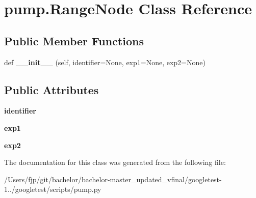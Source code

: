 \hypertarget{classpump_1_1_range_node}{}\section{pump.\+Range\+Node Class Reference}
\label{classpump_1_1_range_node}
\subsection*{Public Member Functions}
\begin{DoxyCompactItemize}
\item 
\mbox{\label{classpump_1_1_range_node_a58e85945a5a6e2f899e8243422c871e3}} 
def {\bfseries \+\_\+\+\_\+init\+\_\+\+\_\+} (self, identifier=None, exp1=None, exp2=None)
\end{DoxyCompactItemize}
\subsection*{Public Attributes}
\begin{DoxyCompactItemize}
\item 
\mbox{\label{classpump_1_1_range_node_ae75b9f31ba8c3bd048cf09b22035efa0}} 
{\bfseries identifier}
\item 
\mbox{\label{classpump_1_1_range_node_acbb59f8c5e23d23563ca03f21574ce63}} 
{\bfseries exp1}
\item 
\mbox{\label{classpump_1_1_range_node_afe153ee472b121652a51c62c1522cc13}} 
{\bfseries exp2}
\end{DoxyCompactItemize}


The documentation for this class was generated from the following file\+:\begin{DoxyCompactItemize}
\item 
/\+Users/fjp/git/bachelor/bachelor-\/master\+\_\+updated\+\_\+vfinal/googletest-\/1../googletest/scripts/pump.\+py\end{DoxyCompactItemize}
